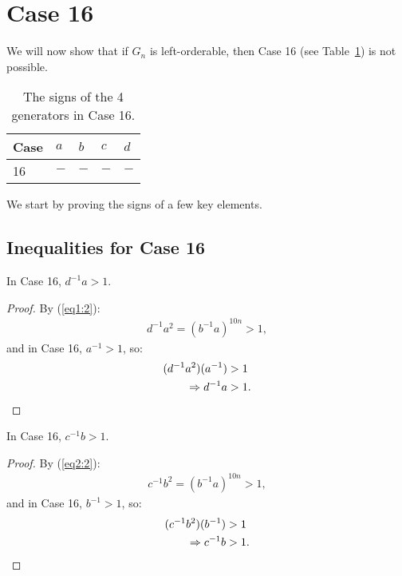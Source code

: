 \section{Case 16}
\label{section:case16}

\noindent{}We will now show that if $G_n$ is left-orderable, then Case 16 (see Table~\ref{table:case16}) is not possible.

\begin{table}[ht]
\begin{center}
\begin{tabular}{l | l | l | l | l}
Case\hspace{10 pt} & $a$\hspace{10 pt} & $b$\hspace{10 pt} & $c$\hspace{10 pt} & $d$\hspace{10 pt} \\\hline\hline
16 & $-$ & $-$ & $-$ & $-$
\end{tabular}
\end{center}
\caption{The signs of the 4 generators in Case 16.}
\label{table:case16}
\end{table}

\noindent{}We start by proving the signs of a few key elements.

\subsection{Inequalities for Case 16}

\begin{lemma} In Case 16, $d^{-1}a>1$.
\label{lemma:case16:Da}
\end{lemma}
\begin{proof}
By (\ref{eq1:2}):
\begin{align*}
d^{-1}a^{2}=(b^{-1}a)^{10n}>1,
\end{align*}
and in Case 16, $a^{-1}>1$, so:
\begin{align*}
(d^{-1}a^{2})(a^{-1})&>1\\
\Rightarrow{}d^{-1}a&>1.\qedhere
\end{align*}
\end{proof}

\begin{lemma} In Case 16, $c^{-1}b>1$.
\label{lemma:case16:Cb}
\end{lemma}
\begin{proof}
By (\ref{eq2:2}):
\begin{align}
c^{-1}b^{2}=(b^{-1}a)^{10n}>1,\label{inEq2}
\end{align}
and in Case 16, $b^{-1}>1$, so:
\begin{align*}
(c^{-1}b^{2})(b^{-1})&>1\\
\Rightarrow{}c^{-1}b&>1.\qedhere
\end{align*}
\end{proof}


